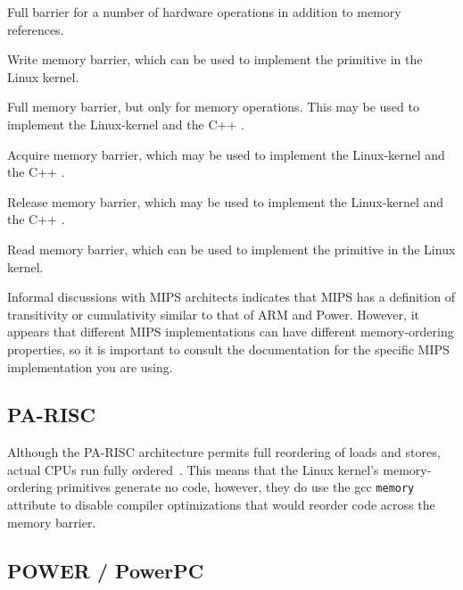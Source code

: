 \begin{description}[style=nextline]
\item[\tco{SYNC}]
	Full barrier for a number of hardware operations in addition
	to memory references.
\item[\tco{SYNC_WMB}]
	Write memory barrier, which can be used to implement the
	 primitive in the Linux kernel.
\item[\tco{SYNC_MB}]
	Full memory barrier, but only for memory operations.
	This may be used to implement the Linux-kernel 
	and the C++ .
\item[\tco{SYNC_ACQUIRE}]
	Acquire memory barrier, which may be used to implement the
	Linux-kernel  and the C++
	.
\item[\tco{SYNC_RELEASE}]
	Release memory barrier, which may be used to implement the
	Linux-kernel  and the C++
	.
\item[\tco{SYNC_RMB}]
	Read memory barrier, which can be used to implement the
	 primitive in the Linux kernel.
\end{description}

Informal discussions with MIPS architects indicates that MIPS has a
definition of transitivity or cumulativity similar to that of
ARM and Power.
However, it appears that different MIPS implementations can have
different memory-ordering properties, so it is important to consult
the documentation for the specific MIPS implementation you are using.

\subsection{PA-RISC}

Although the PA-RISC architecture permits full reordering of loads and
stores, actual CPUs run fully ordered~\cite{GerryKane96a}.
This means that the Linux kernel's memory-ordering primitives generate
no code, however, they do use the gcc {\tt memory} attribute to disable
compiler optimizations that would reorder code across the memory
barrier.

\subsection{POWER / PowerPC}
\label{sec:memorder:POWER / PowerPC}


